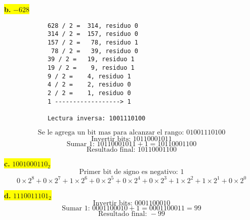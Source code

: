 \documentclass[a4paper,12pt]{article}
\begin{document}
		\begin{center}
		\colorbox{yellow}{{\textbf{b.} $-628$}} \\ \vspace{0.3cm}
		\begin{Verbatim}
			628 / 2 =  314, residuo 0
			314 / 2 =  157, residuo 0
			157 / 2 =   78, residuo 1
			 78 / 2 =   39, residuo 0
			39 / 2 =   19, residuo 1
			19 / 2 =    9, residuo 1
			9 / 2 =    4, residuo 1
			4 / 2 =    2, residuo 0
			2 / 2 =    1, residuo 0
			1 ------------------> 1
			
			Lectura inversa: 1001110100
		\end{Verbatim}
		\[
		\text{Se le agrega un bit mas para alcanzar el rango: } 01001110100
		\]
		\[
		\text{Invertir bits: } 10110001011
		\]
		\[
		\text{Sumar 1: } 10110001011 + 1 = 10110001100
		\]
		\[
		\boxed{\text{Resultado final: } 10110001100}
		\]
	\end{center}
	
	\begin{center}
		\colorbox{yellow}{{\textbf{c.} $1001000110_2$}} \\
		\[
		\text{Primer bit de signo es negativo: } 1
		\] 
		\[
		0\times2^{8} + 0\times2^{7} + 1\times2^{6} + 0\times2^{5} + 0\times2^{4} + 0\times2^{3} + 1\times2^{2} + 1\times2^{1} + 0\times2^{0}
		\]
	\end{center}
	
	\begin{center}
	\colorbox{yellow}{{\textbf{d.} $1110011101_2$}} \\
	\[
	\text{Invertir bits: } 0001100010
	\]
	\[
	\text{Sumar 1: } 0001100010 + 1 = 0001100011 = 99
	\]
	\[
	\boxed{\text{Resultado final: } -99}
	\]
	\end{center}
	
	
\end{document}
